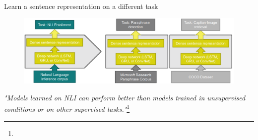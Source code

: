 \documentclass[12pt,aspectratio=169,handout]{beamer}
\begin{document}
\begin{frame}{Learn a sentence representation on a different task}
	
	\begin{figure}
		\includegraphics[width=0.9\linewidth]{img/transfer.png}
	\end{figure}
	
	\begin{small}
		\emph{"Models learned on NLI can perform better than models trained in unsupervised conditions or on other supervised tasks."}\footnote{}
	\end{small}
	
	
\end{frame}
\end{document}
